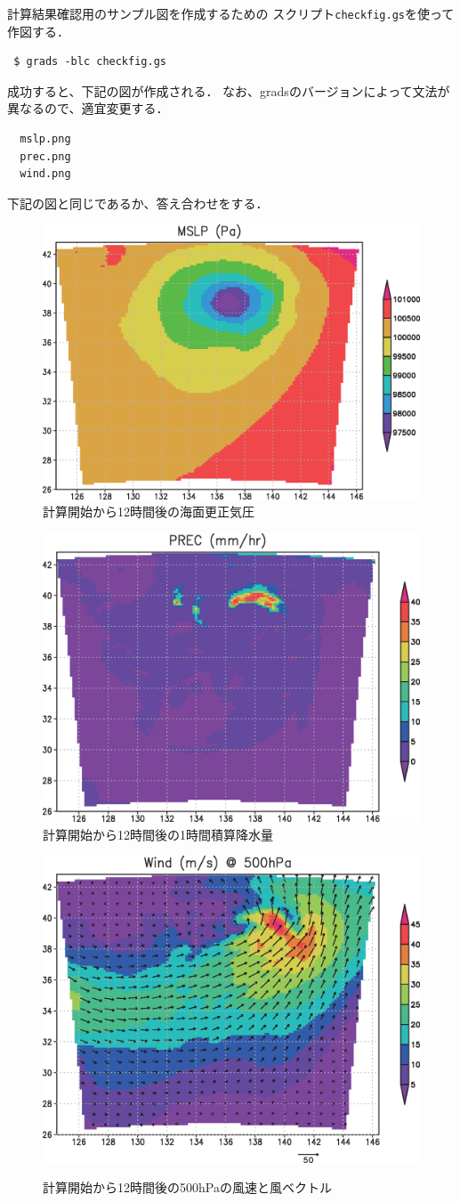 計算結果確認用のサンプル図を作成するための
スクリプト\verb|checkfig.gs|を使って作図する．
\begin{verbatim}
 $ grads -blc checkfig.gs
\end{verbatim}
成功すると、下記の図が作成される．
なお、gradsのバージョンによって文法が異なるので、適宜変更する．
\begin{verbatim}
  mslp.png
  prec.png
  wind.png
\end{verbatim}
下記の図と同じであるか、答え合わせをする．

\begin{figure}[h]
\begin{center}
  \includegraphics[width=0.55\hsize]{./figure/real_mslp.eps}\\
  \caption{計算開始から12時間後の海面更正気圧}
  \label{fig:real_mslp}
\end{center}
\begin{center}
  \includegraphics[width=0.55\hsize]{./figure/real_prec.eps}\\
  \caption{計算開始から12時間後の1時間積算降水量}
  \label{fig:real_prec}
\end{center}
\begin{center}
  \includegraphics[width=0.55\hsize]{./figure/real_wind.eps}\\
  \caption{計算開始から12時間後の500hPaの風速と風ベクトル}
  \label{fig:real_wind}
\end{center}
\end{figure}



